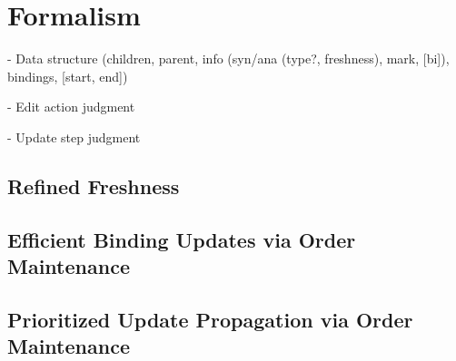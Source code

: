 
\section{Formalism}%
\label{sec:Formalism}

- Data structure (children, parent, info (syn/ana (type?, freshness), mark, [bi]), bindings, [start, end])

- Edit action judgment

- Update step judgment


\subsection{Refined Freshness}

\subsection{Efficient Binding Updates via Order Maintenance}

\subsection{Prioritized Update Propagation via Order Maintenance}